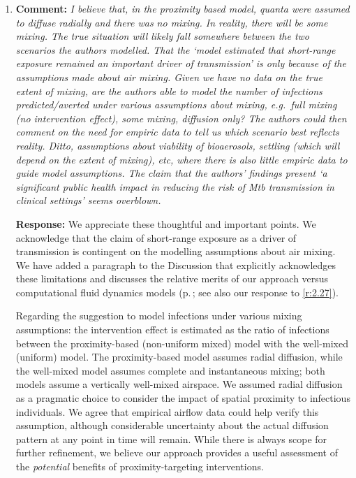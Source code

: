 \documentclass[11pt]{article}
\newcommand{\comment}[1]{\textbf{Comment:} \textit{#1}}
\newcommand{\response}[1]{\textbf{Response:} #1}
\begin{document}
\begin{enumerate}[label=\textbf{R2.\arabic*.}, leftmargin=*]
\item\label{r:2.7} \comment{I believe that, in the proximity based model, quanta were assumed to diffuse radially and there was no mixing. In reality, there will be some mixing. The true situation will likely fall somewhere between the two scenarios the authors modelled. That the `model estimated that short-range exposure remained an important driver of transmission' is only because of the assumptions made about air mixing. Given we have no data on the true extent of mixing, are the authors able to model the number of infections predicted/averted under various assumptions about mixing, e.g.\ full mixing (no intervention effect), some mixing, diffusion only? The authors could then comment on the need for empiric data to tell us which scenario best reflects reality. Ditto, assumptions about viability of bioaerosols, settling (which will depend on the extent of mixing), etc, where there is also little empiric data to guide model assumptions. The claim that the authors' findings present `a significant public health impact in reducing the risk of \emph{Mtb} transmission in clinical settings' seems overblown.}

\response{We appreciate these thoughtful and important points. We acknowledge that the claim of short-range exposure as a driver of transmission is contingent on the modelling assumptions about air mixing. We have added a paragraph to the Discussion that explicitly acknowledges these limitations and discusses the relative merits of our approach versus computational fluid dynamics models (p.\,\pageref{chg:R2.27}; see also our response to \ref{r:2.27}).

Regarding the suggestion to model infections under various mixing assumptions: the intervention effect is estimated as the ratio of infections between the proximity-based (non-uniform mixed) model with the well-mixed (uniform) model. The proximity-based model assumes radial diffusion, while the well-mixed model assumes complete and instantaneous mixing; both models assume a vertically well-mixed airspace. We assumed radial diffusion as a pragmatic choice to consider the impact of spatial proximity to infectious individuals. We agree that empirical airflow data could help verify this assumption, although considerable uncertainty about the actual diffusion pattern at any point in time will remain. While there is always scope for further refinement, we believe our approach provides a useful assessment of the \textit{potential} benefits of proximity-targeting interventions.

}
\end{enumerate}
\end{document}

